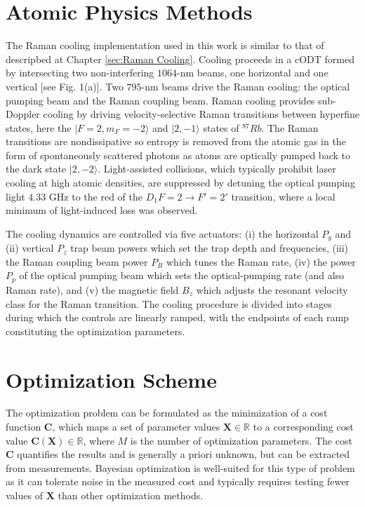 \documentclass{article}
\begin{document}
\section{Atomic Physics Methods}
The Raman cooling implementation used in this work is similar to that of descripbed at Chapter \ref{sec:Raman Cooling}. Cooling proceeds in a cODT formed by intersecting two non-interfering $1064$-nm beams, one horizontal and one vertical [see Fig. 1(a)]. Two $795$-nm beams drive the Raman cooling: the optical pumping beam and the Raman coupling beam. Raman cooling provides sub-Doppler cooling by driving velocity-selective Raman transitions between hyperfine states, here the $\vert F = 2, m_F = -2 \rangle$ and $\vert 2,-1 \rangle$ states of $^{87}Rb$. The Raman transitions are nondissipative so entropy is removed from the atomic gas in the form of spontaneously scattered photons as atoms are optically pumped back to the dark state $\vert 2,-2\rangle$. Light-assisted collisions, which typically prohibit laser cooling at high atomic densities, are suppressed by detuning the optical pumping light $4.33$ GHz to the red of the $D_1 F = 2 \rightarrow F' = 2'$ transition, where a local minimum of light-induced loss was observed.

The cooling dynamics are controlled via five actuators: (i) the horizontal $P_y$ and (ii) vertical $P_z$ trap beam powers which set the trap depth and frequencies, (iii) the Raman coupling beam power $P_R$ which tunes the Raman rate, (iv) the power $P_p$ of the optical pumping beam which sets the optical-pumping rate (and also Raman rate), and (v) the magnetic field $B_z$ which adjusts the resonant velocity class for the Raman transition. The cooling procedure is divided into stages during which the controls are linearly ramped, with the endpoints of each ramp constituting the optimization parameters.

\section{Optimization Scheme}
The optimization problem can be formulated as the minimization of a cost function $\mathbf{C}$, which maps a set of parameter values $\mathbf{X} \in \mathbb{R}$ to a corresponding cost value $\mathbf{C}(\mathbf{X}) \in \mathbb{R}$, where $M$ is the number of optimization parameters. The cost $\mathbf{C}$ quantifies the results and is generally a priori unknown, but can be extracted from measurements. Bayesian optimization is well-suited for this type of problem as it can tolerate noise in the measured cost and typically requires testing fewer values of $\mathbf{X}$ than other optimization methods.
\end{document}
